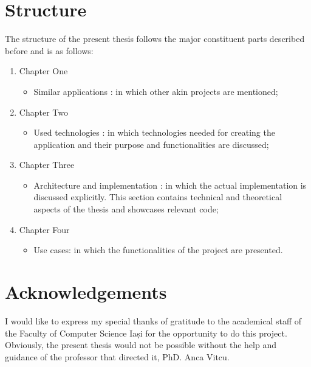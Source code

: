 	\section{Structure}
	The structure of the present thesis follows the major constituent parts described before and is as follows:
	\begin{enumerate}
	\item Chapter One
		\begin{itemize}
			\item Similar applications :  in which other akin projects are mentioned;
		\end{itemize}

	\item Chapter Two
		\begin{itemize}
			\item Used technologies : in which technologies needed for creating the application and their purpose and functionalities are discussed;

		\end{itemize}
	\item Chapter Three
		\begin{itemize}
		\item Architecture and implementation : in which the actual implementation is discussed explicitly. This section contains technical and theoretical aspects of the thesis and  showcases relevant code;

		\end{itemize}
	\item Chapter Four
		\begin{itemize}
			\item Use cases:  in which the functionalities of the project are presented.

		\end{itemize}
	\end{enumerate}

 	\section{Acknowledgements}


	I would like to express my special thanks of gratitude to the academical staff of the Faculty of Computer Science Iași for the opportunity to do this project.\\

	Obviously, the present thesis would not be possible without the help and guidance of the professor that directed it, PhD. Anca Vitcu.
